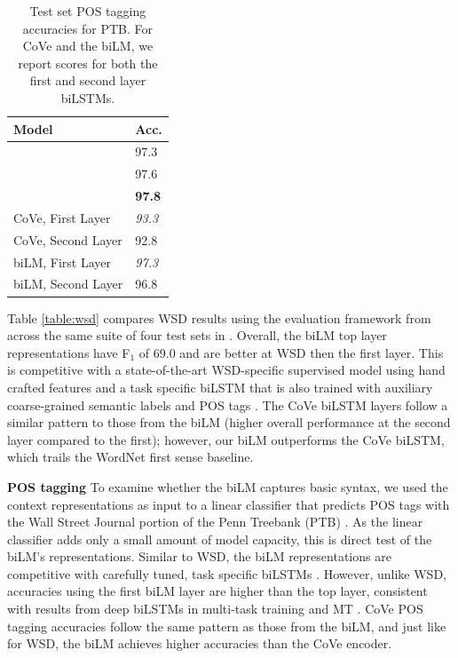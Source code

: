 \documentclass[11pt,a4paper]{article}
\newcommand{\tinysection}[1]{\textbf{#1}}
\begin{document}
\begin{table}
\centering
\label{table:pos}
\begin{tabular}{l|l}
 \textbf{Model} & \textbf{Acc.} \\ \hline \hline
\citet{NLPfromScratch:Collobert2011} & 97.3 \\
\citet{Ma2016EndtoendSL} & 97.6 \\
\citet{Ling2015FindingFI} & \textbf{97.8} \\ \hline
CoVe, First Layer  & \textit{93.3} \\
CoVe, Second Layer  & 92.8 \\ \hline
biLM, First Layer  & \textit{97.3} \\
biLM, Second Layer  &  96.8
\end{tabular}
\caption{Test set POS tagging accuracies for PTB.
For CoVe and the biLM, we report scores for both the first and second layer biLSTMs.}
\end{table}


Table \ref{table:wsd} compares WSD results using the evaluation framework from \citet{Raganato2017WordSD} across the same suite of four test sets in \citet{Raganato2017NeuralSL}.
Overall, the biLM top layer representations have F$_1$ of 69.0 and are better at WSD then the first layer.
This is competitive with a state-of-the-art WSD-specific supervised model using hand crafted features \citep{Iacobacci2016EmbeddingsFW} and a task specific biLSTM that is also trained with auxiliary coarse-grained semantic labels and POS tags \citep{Raganato2017NeuralSL}.
The CoVe biLSTM layers follow a similar pattern to those from the biLM (higher overall performance at the second layer compared to the first); however, our biLM outperforms the CoVe biLSTM, which trails the WordNet first sense baseline.

\tinysection{POS tagging}
To examine whether the biLM captures basic syntax, we used the context representations as input to a linear classifier that predicts POS tags with the Wall Street Journal portion of the Penn Treebank (PTB) \citep{Marcus1993BuildingAL}.
As the linear classifier adds only a small amount of model capacity, this is direct test of the biLM's representations.
Similar to WSD, the biLM representations are competitive with carefully tuned, task specific biLSTMs %
\citep{Ling2015FindingFI,Ma2016EndtoendSL}.
However, unlike WSD, accuracies using the first biLM layer are higher than the top layer, consistent with results from deep biLSTMs in multi-task training \citep{Sgaard2016DeepML,joint-many-iclr07} and MT \citep{Belinkov2017WhatDN}.
CoVe POS tagging accuracies follow the same pattern as those from the biLM, and just like for WSD, the biLM achieves higher accuracies than the CoVe encoder.
\end{document}
